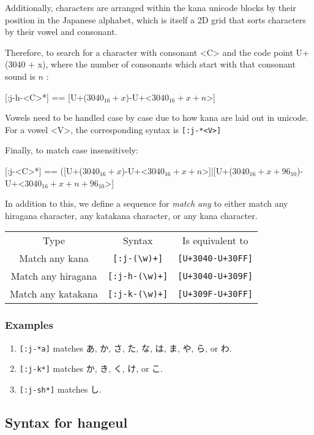 \documentclass{article}
\begin{document}
Additionally, characters are arranged within the kana unicode blocks by their
position in the Japanese alphabet, which is itself a 2D grid that sorts
characters by their vowel and consonant.

Therefore, to search for a character with consonant <C> and the code point
U+(3040 + x), where the number of consonants which start with that consonant
sound is $ n $ :

[:j-h-<C>*] == [U+($ 3040_{16} + x $)-U+<$ 3040_{16} + x + n $>]

Vowels need to be handled case by case due to how kana are laid out in unicode.
For a vowel <V>, the corresponding syntax is \texttt{[:j-*<V>]}

Finally, to match case insensitively:

[:j-<C>*] == ([U+($ 3040_{16} + x $)-U+<$ 3040_{16} + x + n $>]|[U+($ 3040_{16}
+ x + 96_{10} $)-U+<$ 3040_{16} + x + n + 96_{10} $>]

In addition to this, we define a sequence for \textit{match any} to either match
any hiragana character, any katakana character, or any kana character.

\begin{tabular}{| c | c | c |}
  Type & Syntax & Is equivalent to
  \\
  Match any kana & \texttt{[:j-(\textbackslash w)+]} & \texttt{[U+3040-U+30FF]}
  \\
  Match any hiragana & \texttt{[:j-h-(\textbackslash w)+]} &
  \texttt{[U+3040-U+309F]}
  \\
  Match any katakana & \texttt{[:j-k-(\textbackslash w)+]} &
  \texttt{[U+309F-U+30FF]}
  \\
\end{tabular}

\subsubsection{Examples}

\begin{enumerate}
  \item \texttt{[:j-*a]} matches あ, か, さ, た, な, は, ま, や, ら, or わ.
  \item \texttt{[:j-k*]} matches か, き, く, け, or こ.
  \item \texttt{[:j-sh*]} matches し.
\end{enumerate}


\subsection{Syntax for hangeul}
\end{document}
